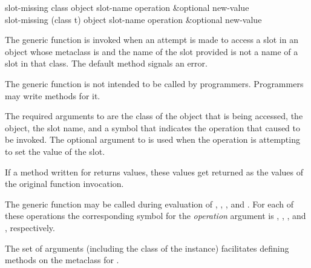 \begin{defun}
slot-missing class object slot-name operation &optional new-value \\
slot-missing (class t) object slot-name operation &optional new-value

The generic function  is invoked when an attempt is
made to access a slot in an object whose metaclass is 
 and the name of the slot provided is not a name of a
slot in that class.  
The default method signals an error.

The generic function  is not intended to be called by
programmers.  Programmers may write methods for it.





The required arguments to  are the class of the object
that is being accessed, the object, the slot name, and a symbol that
indicates the operation that caused   to be invoked.
The optional argument to  is used when the operation
is attempting to set the value of the slot.


If a method written for  returns values, these
values get returned as the values of the original function invocation.


The generic function  may be called during
evaluation of , , 
, and .  For each
of these operations the corresponding symbol for the {\it operation\/}
argument is , , , and 
, respectively.

The set of arguments (including the class of the instance) facilitates
defining methods on the metaclass for .

\end{defun}


